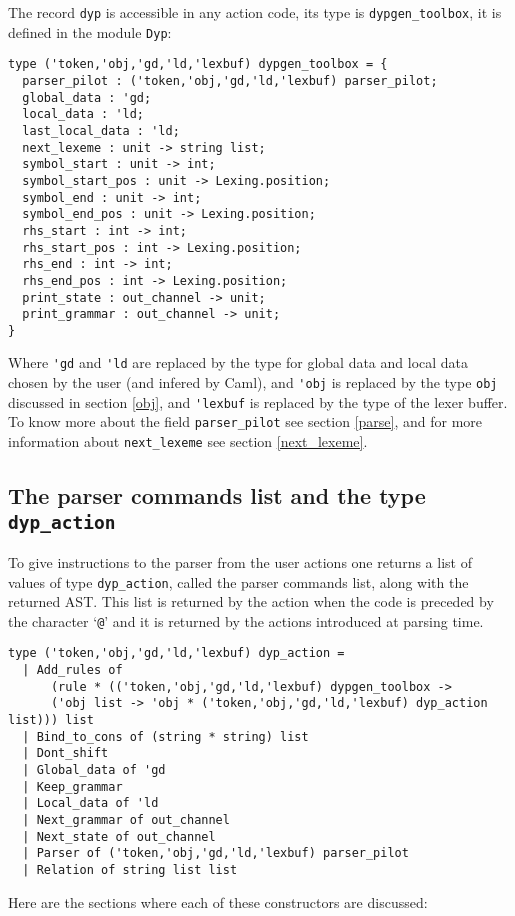\documentclass[12pt]{article}
\begin{document}
{The record \verb|dyp| is accessible in any action code, its type is \verb|dypgen_toolbox|, it is defined in the module \verb|Dyp|:
\begin{verbatim}
type ('token,'obj,'gd,'ld,'lexbuf) dypgen_toolbox = {
  parser_pilot : ('token,'obj,'gd,'ld,'lexbuf) parser_pilot;
  global_data : 'gd;
  local_data : 'ld;
  last_local_data : 'ld;
  next_lexeme : unit -> string list;
  symbol_start : unit -> int;
  symbol_start_pos : unit -> Lexing.position;
  symbol_end : unit -> int;
  symbol_end_pos : unit -> Lexing.position;
  rhs_start : int -> int;
  rhs_start_pos : int -> Lexing.position;
  rhs_end : int -> int;
  rhs_end_pos : int -> Lexing.position;
  print_state : out_channel -> unit;
  print_grammar : out_channel -> unit;
}
\end{verbatim}
Where \verb|'gd| and \verb|'ld| are replaced by the type for global data and local data chosen by the user (and infered by Caml), and \verb|'obj| is replaced by the type \verb|obj| discussed in section \ref{obj}, and \verb|'lexbuf| is replaced by the type of the lexer buffer. To know more about the field \verb|parser_pilot| see section \ref{parse}, and for more information about \verb|next_lexeme| see section \ref{next_lexeme}.

\subsection{The parser commands list and the type \texttt{dyp\_action}}\label{dyp_action}

To give instructions to the parser from the user actions one returns a list of values of type \verb|dyp_action|, called the parser commands list, along with the returned AST. This list is returned by the action when the code is preceded by the character `\verb|@|' and it is returned by the actions introduced at parsing time.
\begin{verbatim}
type ('token,'obj,'gd,'ld,'lexbuf) dyp_action =
  | Add_rules of
      (rule * (('token,'obj,'gd,'ld,'lexbuf) dypgen_toolbox ->
      ('obj list -> 'obj * ('token,'obj,'gd,'ld,'lexbuf) dyp_action list))) list
  | Bind_to_cons of (string * string) list
  | Dont_shift
  | Global_data of 'gd
  | Keep_grammar
  | Local_data of 'ld
  | Next_grammar of out_channel
  | Next_state of out_channel
  | Parser of ('token,'obj,'gd,'ld,'lexbuf) parser_pilot
  | Relation of string list list
\end{verbatim}

Here are the sections where each of these constructors are discussed:

}
\end{document}
